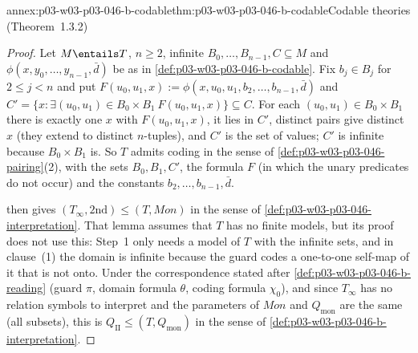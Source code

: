 \begin{annexitem}{annex:p03-w03-p03-046-b-codable}{thm:p03-w03-p03-046-b-codable}{Codable theories (Theorem~1.3.2)}
\begin{proof}
Let \(M\entails T\), \(n\ge2\), infinite \(B_0,\dots,B_{n-1},C\subseteq M\)
and \(\phi(x,y_0,\dots,y_{n-1},\bar d)\) be as in
\cref{def:p03-w03-p03-046-b-codable}. Fix \(b_j\in B_j\) for \(2\le j<n\)
and put \(F(u_0,u_1,x):=\phi(x,u_0,u_1,b_2,\dots,b_{n-1},\bar d)\) and
\(C'=\{x:\exists(u_0,u_1)\in B_0\times B_1\ F(u_0,u_1,x)\}\subseteq C\). For
each \((u_0,u_1)\in B_0\times B_1\) there is exactly one \(x\) with
\(F(u_0,u_1,x)\), it lies in \(C'\), distinct pairs give distinct \(x\)
(they extend to distinct \(n\)-tuples), and \(C'\) is the set of values;
\(C'\) is infinite because \(B_0\times B_1\) is. So \(T\) admits coding in
the sense of \cref{def:p03-w03-p03-046-pairing}(2), with the sets
\(B_0,B_1,C'\), the formula \(F\) (in which the unary predicates do not
occur) and the constants \(b_2,\dots,b_{n-1},\bar d\).

 then gives
\((T_\infty,\mathrm{2nd})\le(T,\mathit{Mon})\) in the sense of
\cref{def:p03-w03-p03-046-interpretation}. That lemma assumes that \(T\) has
no finite models, but its proof does not use this: Step~1 only needs a
model of \(T\) with the infinite sets, and in clause~(1) the domain is
infinite because the guard codes a one-to-one self-map of it that is not
onto. Under the correspondence stated after
\cref{def:p03-w03-p03-046-b-reading} (guard \(\pi\), domain formula
\(\theta\), coding formula \(\chi_0\)), and since \(T_\infty\) has no
relation symbols to interpret and the parameters of \(\mathit{Mon}\) and
\(Q_{\mathrm{mon}}\) are the same (all subsets), this is
\(Q_{\mathrm{II}}\le(T,Q_{\mathrm{mon}})\) in the sense of
\cref{def:p03-w03-p03-046-b-interpretation}.
\end{proof}
\end{annexitem}

